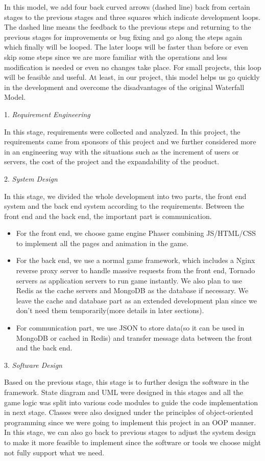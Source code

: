 \documentclass[a4paper,11pt]{article}
\begin{document}
In this model, we add four back curved arrows (dashed line) back from certain stages to the previous stages and three squares which indicate development loops. The dashed line means the feedback to the previous steps and returning to the previous stages for improvements or bug fixing and go along the steps again which finally will be looped. The later loops will be faster than before or even skip some steps since we are more familiar with the operations and less modification is needed or even no changes take place. For small projects, this loop will be feasible and useful. At least, in our project, this model helps us go quickly in the development and overcome the disadvantages of the original Waterfall Model.

1.	\emph{Requirement Engineering}

In this stage, requirements were collected and analyzed. In this project, the requirements came from sponsors of this project and we further considered more in an engineering way with the situations such as the increment of users or servers, the cost of the project and the expandability of the product.

2.	\emph{System Design}

In this stage, we divided the whole development into two parts, the front end system and the back end system according to the requirements. Between the front end and the back end, the important part is communication.
	\begin{itemize}
	\item For the front end, we choose game engine Phaser combining JS/HTML/CSS to implement all the pages and animation in the game.
	\item For the back end, we use a normal game framework, which includes a Nginx reverse proxy server to handle massive requests from the front end, Tornado servers as application servers to run game instantly. We also plan to use Redis as the cache servers and MongoDB as the database if necessary. We leave the cache and database part as an extended development plan since we don't need them temporarily(more details in later sections).
	\item For communication part, we use JSON to store data(so it can be used in MongoDB or cached in Redis) and transfer message data between the front and the back end.
    \end{itemize}

3.	\emph{Software Design}

Based on the previous stage, this stage is to further design the software in the framework. State diagram and UML were designed in this stages and all the game logic was split into various code modules to guide the code implementation in next stage. Classes were also designed under the principles of object-oriented programming since we were going to implement this project in an OOP manner. In this stage, we can also go back to previous stages to adjust the system design to make it more feasible to implement since the software or tools we choose might not fully support what we need.
\end{document}
